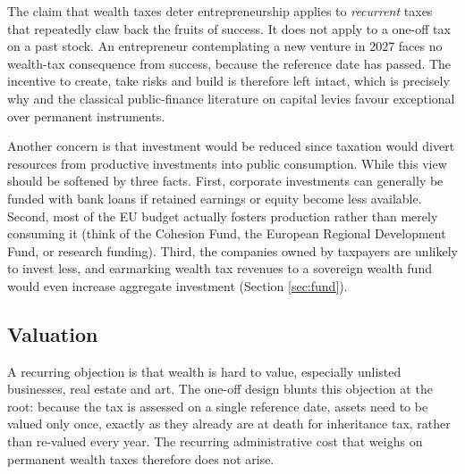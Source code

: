 \documentclass[../../main]{subfiles}
\begin{document}

The claim that wealth taxes deter entrepreneurship applies to \emph{recurrent} taxes that repeatedly claw back the fruits of success. It does not apply to a one-off tax on a past stock. An entrepreneur contemplating a new venture in 2027 faces no wealth-tax consequence from success, because the reference date has passed. The incentive to create, take risks and build is therefore left intact, which is precisely why \citet{PisaniFerryMahfouz2023} and the classical public-finance literature on capital levies favour exceptional over permanent instruments.

Another concern is that investment would be reduced since taxation would divert resources from productive investments into public consumption. While this view should be softened by three facts. First, corporate investments can generally be funded with bank loans if retained earnings or equity become less available. Second, most of the EU budget actually fosters production rather than merely consuming it (think of the Cohesion Fund, the European Regional Development Fund,  %
or research funding). Third, the companies owned by taxpayers are unlikely to invest less, and earmarking wealth tax revenues to a sovereign wealth fund would even increase aggregate investment (Section \ref{sec:fund}).  %

\subsection{Valuation}

A recurring objection is that wealth is hard to value, especially unlisted businesses, real estate and art. The one-off design blunts this objection at the root: because the tax is assessed on a single reference date, assets need to be valued only once, exactly as they already are at death for inheritance tax, rather than re-valued every year. The recurring administrative cost that weighs on permanent wealth taxes therefore does not arise.
\end{document}
